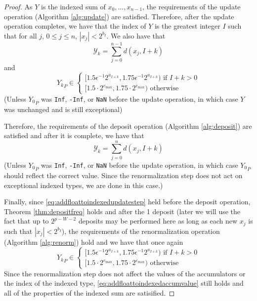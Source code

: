   \begin{proof}
    As $Y$ is the indexed sum of $x_0, ..., x_{n - 1}$, the requirements of the update operation (Algorithm \ref{alg:update}) are satisfied. Therefore, after the update operation completes, we have that the index of $Y$ is the greatest integer $I$ such that for all $j$, $0 \leq j \leq n$, $|x_j| < 2^{b_I}$. We also have that 
\[
\mathcal{Y}_k = \sum\limits_{j = 0}^{n - 1} d(x_j, I + k)
\]
  and
  \begin{equation}
          {Y_k}_P \in \begin{cases}[1.5  \epsilon^{-1} 2^{a_{I + k}}, 1.75  \epsilon^{-1} 2^{a_{I + k}}) \text{ if } I + k > 0 \\ [1.5 \cdot 2^{e_{\max}}, 1.75 \cdot 2^{e_{\max}})\text{ otherwise}\end{cases} \label{eq:addfloattoindexedupdatestep}
  \end{equation}
  (Unless ${Y_0}_P$ was \texttt{Inf}, \texttt{-Inf}, or \texttt{NaN} before the update operation, in which case $Y$ was unchanged and is still exceptional)

  Therefore, the requirements of the deposit operation (Algorithm \ref{alg:deposit}) are satisfied and after it is complete, we have that
  \begin{equation}
    \mathcal{Y}_k = \sum\limits_{j = 0}^{n} d(x_j, I + k)
    \label{eq:addfloattoindexedaccumvalue}
  \end{equation}
  (Unless ${Y_0}_P$ was \texttt{Inf}, \texttt{-Inf}, or \texttt{NaN} before the update operation, in which case ${Y_0}_P$ should reflect the correct value. Since the renormalization step does not act on exceptional indexed types, we are done in this case.)

  Finally, since \eqref{eq:addfloattoindexedupdatestep} held before the deposit operation, Theorem \ref{thm:depositfreq} holds and after the 1 deposit (later we will use the fact that up to $2^{p - W - 2}$ deposits may be performed here as long as each new $x_j$ is such that $|x_j| < 2^{b_I}$), the requirements of the renormalization operation (Algorithm \ref{alg:renorm}) hold and we have that once again
  \[
  {Y_k}_P \in \begin{cases}[1.5  \epsilon^{-1} 2^{a_{I + k}}, 1.75  \epsilon^{-1} 2^{a_{I + k}}) \text{ if } I + k > 0 \\ [1.5 \cdot 2^{e_{\max}}, 1.75 \cdot 2^{e_{\max}})\text{ otherwise}\end{cases}
  \]
  Since the renormalization step does not affect the values of the accumulators or the index of the indexed type, \eqref{eq:addfloattoindexedaccumvalue} still holds and all of the properties of the indexed sum are satisified.
  \end{proof}

